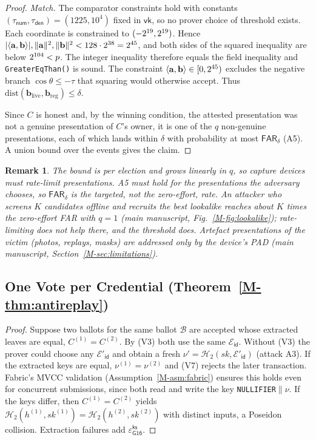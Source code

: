 \documentclass[10pt,letterpaper,journal]{IEEEtran}
\newtheorem{remark}[theorem]{Remark}
\begin{document}
\begin{proof}
\emph{Match.} The comparator constraints hold with constants $(\tau_{\mathsf{num}}, \tau_{\mathsf{den}}) = (1225, 10^4)$ fixed in $\mathsf{vk}$, so no prover choice of threshold exists. Each coordinate is constrained to $(-2^{19}, 2^{19})$. Hence $|\langle \mathbf{a}, \mathbf{b} \rangle|, \|\mathbf{a}\|^2, \|\mathbf{b}\|^2 < 128 \cdot 2^{38} = 2^{45}$, and both sides of the squared inequality are below $2^{104} < p$. The integer inequality therefore equals the field inequality and \texttt{GreaterEqThan(\nCmpBits)} is sound. The constraint $\langle \mathbf{a}, \mathbf{b} \rangle \in [0, 2^{45})$ excludes the negative branch $\cos\theta \leq -\tau$ that squaring would otherwise accept. Thus $\mathrm{dist}(\mathbf{b}_{\text{live}}, \mathbf{b}_{\text{reg}}) \leq \delta$.

Since $C$ is honest and, by the winning condition, the attested presentation was not a genuine presentation of $C$'s owner, it is one of the $q$ non-genuine presentations, each of which lands within $\delta$ with probability at most $\mathsf{FAR}_\delta$ (A5). A union bound over the events gives the claim.
\end{proof}

\begin{remark}
The bound is per election and grows linearly in $q$, so capture devices must rate-limit presentations. A5 must hold for the presentations the adversary \emph{chooses}, so $\mathsf{FAR}_\delta$ is the targeted, not the zero-effort, rate. An attacker who screens $K$ candidates offline and recruits the best lookalike reaches about $K$ times the zero-effort FAR with $q = 1$ (main manuscript, Fig.~\ref{M-fig:lookalike}); rate-limiting does not help there, and the threshold does. Artefact presentations of the victim (photos, replays, masks) are addressed only by the device's PAD (main manuscript, Section~\ref{M-sec:limitations}).
\end{remark}

\subsection{One Vote per Credential (Theorem~\ref{M-thm:antireplay})}
\label{sec:supp-proof-antireplay}

\begin{proof}
Suppose two ballots for the same ballot $\mathcal{B}$ are accepted whose extracted leaves are equal, $C^{(1)} = C^{(2)}$. By (V3) both use the same $\mathcal{E}_{\mathsf{id}}$. Without (V3) the prover could choose any $\mathcal{E}'_{\mathsf{id}}$ and obtain a fresh $\nu' = \mathcal{H}_2(sk, \mathcal{E}'_{\mathsf{id}})$ (attack A3). If the extracted keys are equal, $\nu^{(1)} = \nu^{(2)}$ and (V7) rejects the later transaction. Fabric's MVCC validation (Assumption~\ref{M-asm:fabric}) ensures this holds even for concurrent submissions, since both read and write the key \texttt{NULLIFIER}$\|\nu$. If the keys differ, then $C^{(1)} = C^{(2)}$ yields $\mathcal{H}_2(h^{(1)}, sk^{(1)}) = \mathcal{H}_2(h^{(2)}, sk^{(2)})$ with distinct inputs, a Poseidon collision. Extraction failures add $\varepsilon^{\mathsf{ks}}_{\mathsf{G16}}$.
\end{proof}
\end{document}
